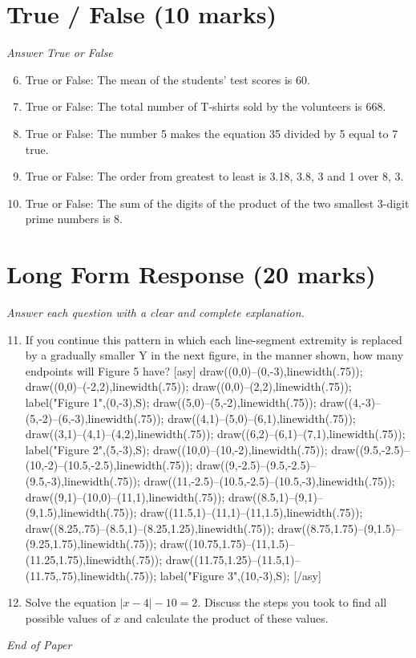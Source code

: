 \documentclass[12pt]{article}
\begin{document}
\section*{True / False (10 marks)}
\textit{Answer True or False}
\begin{enumerate}[label=\arabic*.]
\setcounter{enumi}{5}
\item True or False: The mean of the students' test scores is 60.
\item True or False: The total number of T-shirts sold by the volunteers is 668.
\item True or False: The number 5 makes the equation 35 divided by 5 equal to 7 true.
\item True or False: The order from greatest to least is 3.18, 3.8, 3 and 1 over 8, 3.
\item True or False: The sum of the digits of the product of the two smallest 3-digit prime numbers is 8.
\end{enumerate}

\section*{Long Form Response (20 marks)}
\textit{Answer each question with a clear and complete explanation.}
\begin{enumerate}[label=\arabic*.]
\setcounter{enumi}{10}
\item If you continue this pattern in which each line-segment extremity is replaced by a gradually smaller Y in the next figure, in the manner shown, how many endpoints will Figure 5 have? [asy] draw((0,0)--(0,-3),linewidth(.75)); draw((0,0)--(-2,2),linewidth(.75)); draw((0,0)--(2,2),linewidth(.75)); label("Figure 1",(0,-3),S); draw((5,0)--(5,-2),linewidth(.75)); draw((4,-3)--(5,-2)--(6,-3),linewidth(.75)); draw((4,1)--(5,0)--(6,1),linewidth(.75)); draw((3,1)--(4,1)--(4,2),linewidth(.75)); draw((6,2)--(6,1)--(7,1),linewidth(.75)); label("Figure 2",(5,-3),S); draw((10,0)--(10,-2),linewidth(.75)); draw((9.5,-2.5)--(10,-2)--(10.5,-2.5),linewidth(.75)); draw((9,-2.5)--(9.5,-2.5)--(9.5,-3),linewidth(.75)); draw((11,-2.5)--(10.5,-2.5)--(10.5,-3),linewidth(.75)); draw((9,1)--(10,0)--(11,1),linewidth(.75)); draw((8.5,1)--(9,1)--(9,1.5),linewidth(.75)); draw((11.5,1)--(11,1)--(11,1.5),linewidth(.75)); draw((8.25,.75)--(8.5,1)--(8.25,1.25),linewidth(.75)); draw((8.75,1.75)--(9,1.5)--(9.25,1.75),linewidth(.75)); draw((10.75,1.75)--(11,1.5)--(11.25,1.75),linewidth(.75)); draw((11.75,1.25)--(11.5,1)--(11.75,.75),linewidth(.75)); label("Figure 3",(10,-3),S); [/asy]
\item Solve the equation \( |x-4| - 10 = 2 \). Discuss the steps you took to find all possible values of \( x \) and calculate the product of these values.
\end{enumerate}

\vfill
\noindent\textit{End of Paper}
\end{document}
